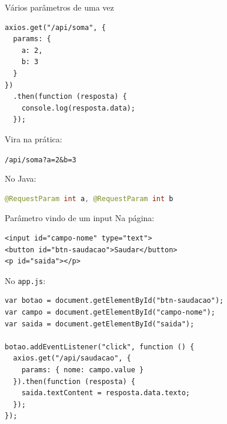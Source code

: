 \documentclass[aspectratio=169,11pt]{beamer}
\begin{document}
\begin{frame}[fragile]{Vários parâmetros de uma vez}
\begin{lstlisting}[basicstyle=\ttfamily\footnotesize]
axios.get("/api/soma", {
  params: {
    a: 2,
    b: 3
  }
})
  .then(function (resposta) {
    console.log(resposta.data);
  });
\end{lstlisting}

  \vspace{0.4em}
  Vira na prática:

  \begin{center}
    \texttt{/api/soma?a=2\&b=3}
  \end{center}

  \vspace{0.5em}
  No Java:
\begin{lstlisting}[language=Java,basicstyle=\ttfamily\footnotesize]
@RequestParam int a, @RequestParam int b
\end{lstlisting}
\end{frame}

\begin{frame}[fragile]{Parâmetro vindo de um input}
  Na página:

\begin{lstlisting}[basicstyle=\ttfamily\footnotesize]
<input id="campo-nome" type="text">
<button id="btn-saudacao">Saudar</button>
<p id="saida"></p>
\end{lstlisting}

  No \texttt{app.js}:

\begin{lstlisting}[basicstyle=\ttfamily\footnotesize]
var botao = document.getElementById("btn-saudacao");
var campo = document.getElementById("campo-nome");
var saida = document.getElementById("saida");

botao.addEventListener("click", function () {
  axios.get("/api/saudacao", {
    params: { nome: campo.value }
  }).then(function (resposta) {
    saida.textContent = resposta.data.texto;
  });
});
\end{lstlisting}
\end{frame}
\end{document}
